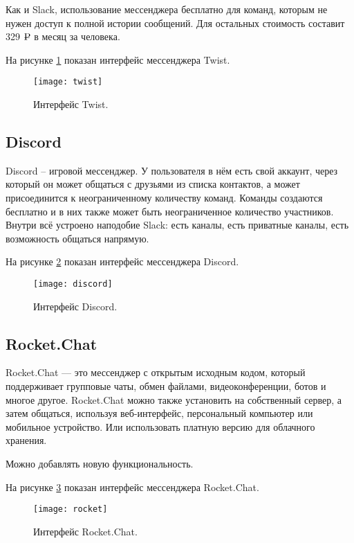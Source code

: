 Как и Slack, использование мессенджера бесплатно для команд, которым не нужен доступ к полной истории сообщений. Для остальных стоимость составит 329 $\rouble$ в месяц за человека.

На рисунке \ref{img:twist} показан интерфейс мессенджера Twist. 

\begin{figure}[H]
	\centering
	\texttt{[image: twist]}
	\caption{Интерфейс Twist. }
	\label{img:twist}
\end{figure}

\subsection{\textbf{Discord}}

Discord \cite{discord} -- игровой мессенджер. У пользователя в нём есть свой аккаунт, через который он может общаться с друзьями из списка контактов, а может присоединится к неограниченному количеству команд. Команды создаются бесплатно и в них также может быть неограниченное количество участников. Внутри всё устроено наподобие Slack: есть каналы, есть приватные каналы, есть возможность общаться напрямую. 

На рисунке \ref{img:discord} показан интерфейс мессенджера Discord. 

\begin{figure}[H]
	\centering
	\texttt{[image: discord]}
	\caption{Интерфейс Discord. }
	\label{img:discord}
\end{figure}

\subsection{\textbf{Rocket.Chat}}

Rocket.Chat \cite{rocket} --- это мессенджер с открытым исходным кодом, который поддерживает групповые чаты, обмен файлами, видеоконференции, ботов и многое другое. Rocket.Chat можно также установить на собственный сервер, а затем общаться, используя веб-интерфейс, персональный компьютер или мобильное устройство. Или использовать платную версию для облачного хранения. 

Можно добавлять новую функциональность. 

На рисунке \ref{img:rocket} показан интерфейс мессенджера Rocket.Chat. 

\begin{figure}[H]
	\centering
	\texttt{[image: rocket]}
	\caption{Интерфейс Rocket.Chat. }
	\label{img:rocket}
\end{figure}


